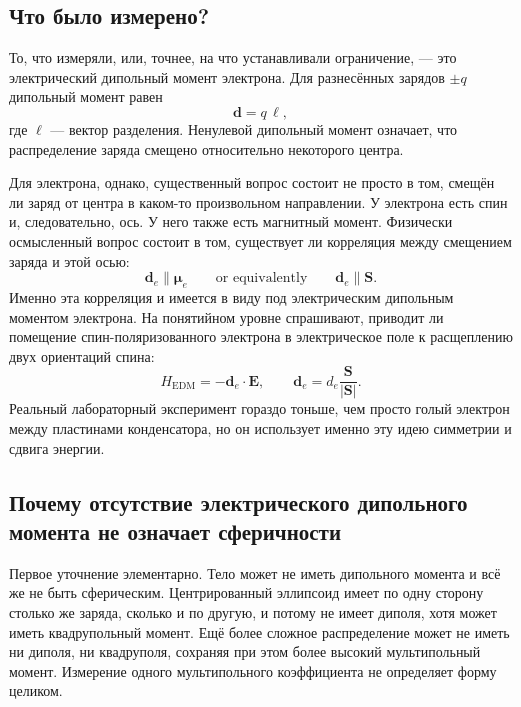 \subsection{Что было измерено?}

То, что измеряли, или, точнее, на что устанавливали ограничение, — это электрический дипольный момент электрона. Для разнесённых зарядов \(\pm q\) дипольный момент равен
\begin{equation}
\mathbf d = q\,\boldsymbol{\ell},
\end{equation}
где \(\boldsymbol{\ell}\) — вектор разделения. Ненулевой дипольный момент означает, что распределение заряда смещено относительно некоторого центра.

Для электрона, однако, существенный вопрос состоит не просто в том, смещён ли заряд от центра в каком-то произвольном направлении. У электрона есть спин и, следовательно, ось. У него также есть магнитный момент. Физически осмысленный вопрос состоит в том, существует ли корреляция между смещением заряда и этой осью:
\begin{equation}
\mathbf d_e \parallel \boldsymbol{\mu}_e
\qquad \text{or equivalently} \qquad
\mathbf d_e \parallel \mathbf S .
\end{equation}
Именно эта корреляция и имеется в виду под электрическим дипольным моментом электрона. На понятийном уровне спрашивают, приводит ли помещение спин-поляризованного электрона в электрическое поле к расщеплению двух ориентаций спина:
\begin{equation}
H_{\mathrm{EDM}}=-\mathbf d_e\cdot \mathbf E,
\qquad
\mathbf d_e=d_e\frac{\mathbf S}{|\mathbf S|}.
\end{equation}
Реальный лабораторный эксперимент гораздо тоньше, чем просто голый электрон между пластинами конденсатора, но он использует именно эту идею симметрии и сдвига энергии.

\subsection{Почему отсутствие электрического дипольного момента не означает сферичности}

Первое уточнение элементарно. Тело может не иметь дипольного момента и всё же не быть сферическим. Центрированный эллипсоид имеет по одну сторону столько же заряда, сколько и по другую, и потому не имеет диполя, хотя может иметь квадрупольный момент. Ещё более сложное распределение может не иметь ни диполя, ни квадруполя, сохраняя при этом более высокий мультипольный момент. Измерение одного мультипольного коэффициента не определяет форму целиком.

